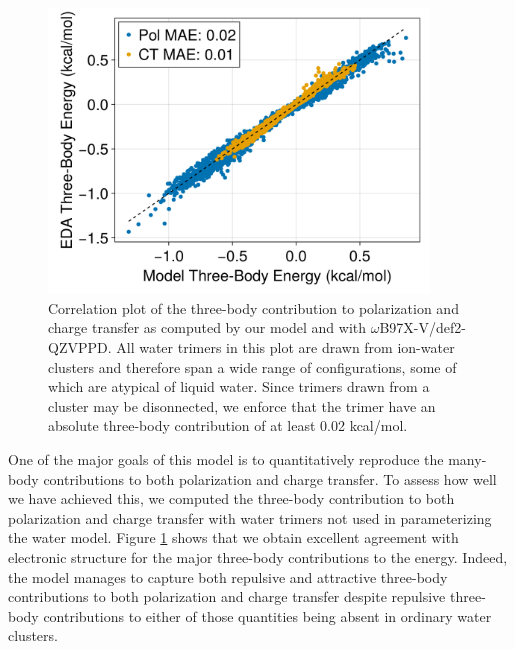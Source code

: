 \documentclass[journal=jctcce,manuscript=article]{achemso}
\begin{document}
\begin{figure}[h]
  \includegraphics*[width=0.9\textwidth]{figures/three_body_pol_and_ct_water.png}
  \caption{Correlation plot of the three-body contribution to polarization and
  charge transfer as computed by our model and with $\omega$B97X-V/def2-QZVPPD.
  All water trimers in this plot are drawn from ion-water clusters and therefore
  span a wide range of configurations, some of which are atypical of liquid water.
  Since trimers drawn from a cluster may be disonnected, we enforce that the trimer
  have an absolute three-body contribution of at least 0.02 kcal/mol.
}
  \label{fig:pol_ct_water}
\end{figure}
One of the major goals of this model is to quantitatively reproduce the many-body contributions to both polarization and charge transfer. To assess how well we have achieved this, we computed the three-body contribution to both polarization and charge transfer with water trimers not used in parameterizing the water model. %
Figure \ref{fig:pol_ct_water} shows that we obtain excellent agreement with electronic structure for the major three-body contributions to the energy. Indeed, the model manages to capture both repulsive and attractive three-body contributions to both polarization and charge transfer despite repulsive three-body contributions to either of those quantities being absent in ordinary water clusters.\cite{heindel2020many} %
\end{document}

